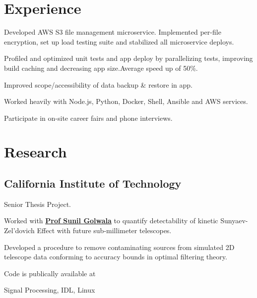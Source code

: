 \documentclass[]{yubo-resume-openfont}
\begin{document}
\hfill
\begin{minipage}[t]{0.66\textwidth}


\section{Experience}

\vspace{\topsep} %
\begin{tightemize}
    \item Developed AWS S3 file management microservice. Implemented per-file
        encryption, set up load testing suite and stabilized all microservice
        deploys.
    \item Profiled and optimized unit tests and app deploy by parallelizing
        tests, improving build caching and decreasing app size.\@ Average speed
        up of 50\%.
    \item Improved scope/accessibility of data backup \& restore in app.
    \item Worked heavily with Node.js, Python, Docker, Shell, Ansible and AWS
        services.
    \item Participate in on-site career fairs and phone interviews.
\end{tightemize}
\sectionsep


\section{Research}
\subsection{California Institute of Technology}
\begin{tightemize}
    \item Senior Thesis Project.
    \item Worked with \textbf{\href{TODO}{Prof Sunil Golwala}} to quantify
        detectability of kinetic Sunyaev-Zel'dovich Effect with future
        sub-millimeter telescopes.
    \item Developed a procedure to remove contaminating sources from
        simulated 2D telescope data conforming to accuracy bounds in optimal
        filtering theory.
    \item Code is publically available at %
    \item Signal Processing, IDL, Linux
\end{tightemize}
\sectionsep


\end{minipage}
\end{document}
